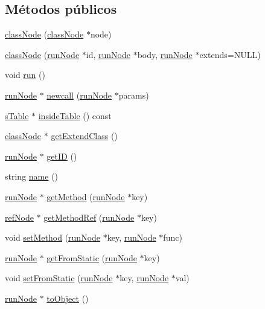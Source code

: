 \subsection*{Métodos públicos}
\begin{DoxyCompactItemize}
\item 
\hyperlink{classclassNode_aae32a053594c335e954a065152583727}{class\-Node} (\hyperlink{classclassNode}{class\-Node} $\ast$node)
\item 
\hyperlink{classclassNode_a7b5f4a91590e3aaf8b4271b157052d25}{class\-Node} (\hyperlink{classrunNode}{run\-Node} $\ast$id, \hyperlink{classrunNode}{run\-Node} $\ast$body, \hyperlink{classrunNode}{run\-Node} $\ast$extends=N\-U\-L\-L)
\item 
void \hyperlink{classclassNode_a65ea61be38e2ecbec6c7766951819939}{run} ()
\item 
\hyperlink{classrunNode}{run\-Node} $\ast$ \hyperlink{classclassNode_a5c58494486e9d1a856d8cdd271875867}{newcall} (\hyperlink{classrunNode}{run\-Node} $\ast$params)
\item 
\hyperlink{classsTable}{s\-Table} $\ast$ \hyperlink{classclassNode_abe7e603b04e733ebdbd0b8816b157cdc}{inside\-Table} () const 
\item 
\hyperlink{classclassNode}{class\-Node} $\ast$ \hyperlink{classclassNode_ab30594178fcfc96d0ce492323b9d3fbd}{get\-Extend\-Class} ()
\item 
\hyperlink{classrunNode}{run\-Node} $\ast$ \hyperlink{classclassNode_aad765264cfeff116c3155dc666fd6fb1}{get\-I\-D} ()
\item 
string \hyperlink{classclassNode_adee266b216dc087f11dd8adc6ea8ad5a}{name} ()
\item 
\hyperlink{classrunNode}{run\-Node} $\ast$ \hyperlink{classclassNode_a19f2361cff152d4d98176ea835f9baa1}{get\-Method} (\hyperlink{classrunNode}{run\-Node} $\ast$key)
\item 
\hyperlink{classrefNode}{ref\-Node} $\ast$ \hyperlink{classclassNode_a19369f3ce811e8f24ef8bc2e11bbe4d0}{get\-Method\-Ref} (\hyperlink{classrunNode}{run\-Node} $\ast$key)
\item 
void \hyperlink{classclassNode_ae3e5d11def9f49cc359bc40d2e77eabb}{set\-Method} (\hyperlink{classrunNode}{run\-Node} $\ast$key, \hyperlink{classrunNode}{run\-Node} $\ast$func)
\item 
\hyperlink{classrunNode}{run\-Node} $\ast$ \hyperlink{classclassNode_aa73ab0f885a76cfb42cb15baa983c0d6}{get\-From\-Static} (\hyperlink{classrunNode}{run\-Node} $\ast$key)
\item 
void \hyperlink{classclassNode_ae78654f623cfe5de2e421bd84f8d41f0}{set\-From\-Static} (\hyperlink{classrunNode}{run\-Node} $\ast$key, \hyperlink{classrunNode}{run\-Node} $\ast$val)
\item 
\hyperlink{classrunNode}{run\-Node} $\ast$ \hyperlink{classclassNode_a12cf5820b06a161bdb04c7a5fe430658}{to\-Object} ()
\end{DoxyCompactItemize}
